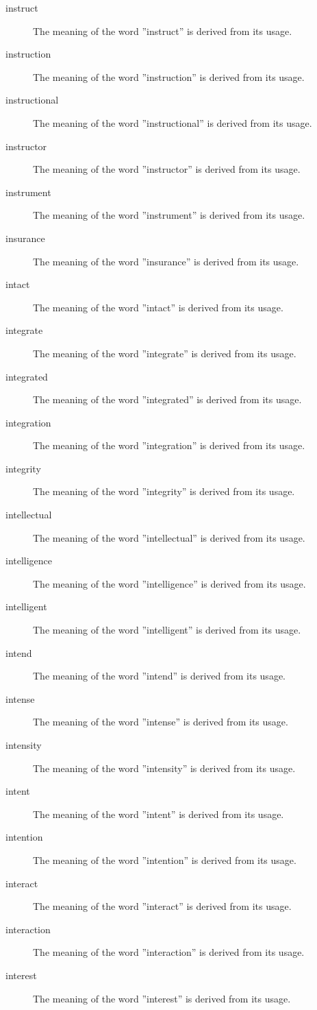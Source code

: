 \documentclass[12pt, letterpaper]{memoir}
\begin{document}
\begin{description}
\item[instruct] The meaning of the word ''instruct'' is derived from its usage.
\item[instruction] The meaning of the word ''instruction'' is derived from its usage.
\item[instructional] The meaning of the word ''instructional'' is derived from its usage.
\item[instructor] The meaning of the word ''instructor'' is derived from its usage.
\item[instrument] The meaning of the word ''instrument'' is derived from its usage.
\item[insurance] The meaning of the word ''insurance'' is derived from its usage.
\item[intact] The meaning of the word ''intact'' is derived from its usage.
\item[integrate] The meaning of the word ''integrate'' is derived from its usage.
\item[integrated] The meaning of the word ''integrated'' is derived from its usage.
\item[integration] The meaning of the word ''integration'' is derived from its usage.
\item[integrity] The meaning of the word ''integrity'' is derived from its usage.
\item[intellectual] The meaning of the word ''intellectual'' is derived from its usage.
\item[intelligence] The meaning of the word ''intelligence'' is derived from its usage.
\item[intelligent] The meaning of the word ''intelligent'' is derived from its usage.
\item[intend] The meaning of the word ''intend'' is derived from its usage.
\item[intense] The meaning of the word ''intense'' is derived from its usage.
\item[intensity] The meaning of the word ''intensity'' is derived from its usage.
\item[intent] The meaning of the word ''intent'' is derived from its usage.
\item[intention] The meaning of the word ''intention'' is derived from its usage.
\item[interact] The meaning of the word ''interact'' is derived from its usage.
\item[interaction] The meaning of the word ''interaction'' is derived from its usage.
\item[interest] The meaning of the word ''interest'' is derived from its usage.

\end{description}
\end{document}

